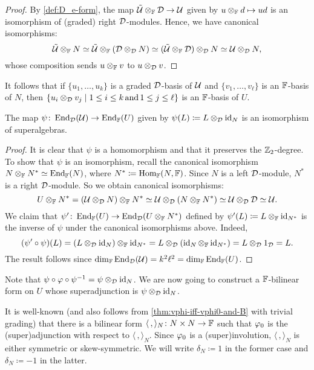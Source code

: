 \begin{proof}
    By \cref{def:D_e-form}, the map $\tilde {\mathcal U} \otimes_{\mathbb{F}} \mathcal{D} \to \mathcal U$ given by $u \otimes_{\mathbb{F}} d \mapsto ud$ is an isomorphism of (graded) right $\mathcal{D}$-modules. 
    Hence, we have canonical isomorphisms:
    \[
        \tilde{\mathcal U} \otimes_{\mathbb{F}} N \simeq \tilde{\mathcal U} \otimes_{\mathbb{F}} (\mathcal{D} \otimes_{\mathcal{D}} N) \simeq (\tilde{\mathcal U} \otimes_{\mathbb{F}} \mathcal{D}) \otimes_{\mathcal{D}} N \simeq \mathcal U \otimes_{\mathcal{D}} N,
    \]
    whose composition sends $u\otimes_{\mathbb{F}} v$ to $u\otimes_{\mathcal{D}} v$.
\end{proof}

It follows that if $\{ u_1, \ldots, u_k \}$ is a graded $\mathcal{D}$-basis of $\mathcal U$ and $\{ v_1, \ldots, v_\ell \}$ is an $\mathbb{F}$-basis of $N$, then $\{ u_i \otimes_{\mathcal{D}} v_j \mid 1\leq i \leq k \,\text{and}\, 1\leq j \leq \ell\}$ is an $\mathbb{F}$-basis of $U$. 

\begin{lemma}\label{lemma:End-over-D-becomes-over-FF}
    The map $\psi\colon \operatorname{End}_{\mathcal{D}}(\mathcal U) \to \operatorname{End}_{\mathbb{F}} (U)$ given by $\psi(L) \coloneqq L \otimes_{\mathcal{D}} \operatorname{id}_N$ is an isomorphism of superalgebras. 
\end{lemma}

\begin{proof}
    It is clear that $\psi$ is a homomorphism and that it preserves the $\mathbb{Z}_2$-degree. 
    To show that $\psi$ is an isomorphism, recall the canonical isomorphism $N\otimes_{\mathbb{F}} N^* \simeq \operatorname{End}_{\mathbb{F}} (N)$, where $N^* \coloneqq \operatorname{Hom}_{\mathbb{F}} (N, \mathbb{F})$. 
    Since $N$ is a left $\mathcal{D}$-module, $N^*$ is a right $\mathcal{D}$-module. 
    So we obtain canonical isomorphisms:
    \[
        U \otimes_{\mathbb{F}} N^* = (\mathcal U \otimes_{\mathcal{D}} N) \otimes_{\mathbb{F}} N^* \simeq \mathcal U \otimes_{\mathcal{D}} (N \otimes_{\mathbb{F}} N^*) \simeq \mathcal U\otimes_{\mathcal{D}} \mathcal{D} \simeq \mathcal U.
    \]
    We claim that $\psi'\colon \operatorname{End}_{\mathbb{F}} (U) \to \operatorname{End}_{\mathcal{D}} (U \otimes_{\mathbb{F}} N^*)$ defined by $\psi'(L) \coloneqq L \otimes_{\mathbb{F}} \operatorname{id}_{N^*}$ is the inverse of $\psi$ under the canonical isomorphisms above. 
    Indeed, 
    \[
        (\psi' \circ \psi) (L) = (L \otimes_{\mathcal{D}} \operatorname{id}_N) \otimes_{\mathbb{F}} \operatorname{id}_{N^*} = L \otimes_{\mathcal{D}} (\operatorname{id}_N \otimes_{\mathbb{F}} \operatorname{id}_{N^*}) = L \otimes_{\mathcal{D}} 1_{\mathcal{D}} = L.
    \]
    The result follows since $\dim_{\mathbb{F}} \operatorname{End}_{\mathcal{D}}(\mathcal U) = k^2\ell^2 = \dim_{\mathbb{F}} \operatorname{End}_{\mathbb{F}} (U)$. 
\end{proof}

Note that $\psi \circ \varphi \circ \psi^{-1} = \psi\otimes_{\mathcal{D}} \operatorname{id}_N$. 
We are now going to construct a $\mathbb{F}$-bilinear form on $U$ whose superadjunction is $\psi\otimes_{\mathcal{D}} \operatorname{id}_N$. 

It is well-known (and also follows from \cref{thm:vphi-iff-vphi0-and-B} with trivial grading) that there is a bilinear form $\langle \, , \rangle_N \colon N\times N \to \mathbb{F}$ such that $\varphi_0$ is the (super)adjunction with respect to $\langle \, , \rangle_N$. 
Since $\varphi_0$ is a (super)involution, $\langle \, , \rangle_N$ is either symmetric or skew-symmetric. 
We will write $\delta_N \coloneqq 1$ in the former case and $\delta_N \coloneqq -1$ in the latter. 

